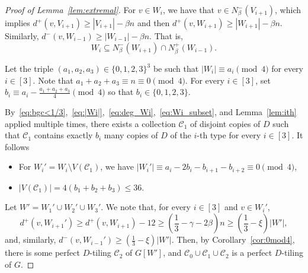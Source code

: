 \documentclass[10pt,a4paper]{amsart}
\newcommand{\C}{\mathcal{C}}
\begin{document}
\begin{proof}[Proof of Lemma~\ref{lem:extremal}]
    For $v \in W_i$, we have that $v \in N_\beta^-(V_{i+1})$, which implies $d^+(v, V_{i+1}) \ge |V_{i+1}|-\beta n$ and then $d^+(v, W_{i+1}) \ge |W_{i+1}|-\beta n$. Similarly, $d^-(v, W_{i-1}) \ge |W_{i-1}|-\beta n$. That is, 
    \begin{equation} \label{eq:Wi_subset}
        W_i \subseteq N_\beta^-(W_{i+1}) \cap N_\beta^+(W_{i-1}).
    \end{equation}
    
    Let the triple $(a_1,a_2,a_3)\in \{0,1,2,3\}^3$ be such that $|W_i| \equiv a_i \pmod 4$ for every $i \in [3]$. Note that $a_1+a_2+a_3 \equiv n \equiv 0 \pmod 4$. For every $i \in [3]$, set $b_i \equiv a_i - \frac{a_1+a_2+a_3}{4} \pmod 4$ so that $b_i \in \{0,1,2,3\}$.
    
    By~\eqref{eq:bgc<1/3},~\eqref{eq:|Wi|},~\eqref{eq:deg_Wi},~\eqref{eq:Wi_subset}, and Lemma~\ref{lem:ith} applied multiple times, there exists a collection $\C_1$ of disjoint copies of $D$ such that $\C_1$ contains exactly $b_i$ many copies of $D$ of the $i$-th type for every $i\in [3]$.
    It follows
    \begin{itemize}
        \item For $W_i'=W_i\setminus V(\C_1)$, we have $|W_i'| \equiv a_i - 2b_i - b_{i+1} -b_{i+2}\equiv 0\pmod 4$,
        \item $|V(\C_1)| = 4 (b_1+b_2+b_3) \le 36$.
    \end{itemize}

    Let $W'=W_1'\cup W_2'\cup W_3'$. We note that, for every $i\in [3]$ and $v \in W_i'$,
    \begin{equation}
        d^+(v, W_{i+1}') \ge d^+(v, W_{i+1}) - 12 \ge   
        \left( \frac{1}{3} - \gamma - 2\beta \right) n \ge
        \left( \frac{1}{3} - \xi \right) |W'|,
    \end{equation}
    and, similarly, $d^-(v, W_{i-1}')\ge \left( \frac{1}{3} - \xi \right) |W'|$.
    Then, by Corollary~\ref{cor:0mod4}, there is some perfect $D$-tiling $\C_2$ of $G[W']$, and $\C_0 \cup\C_1\cup \C_2$ is a perfect $D$-tiling of $G$.
\end{proof}
\end{document}
